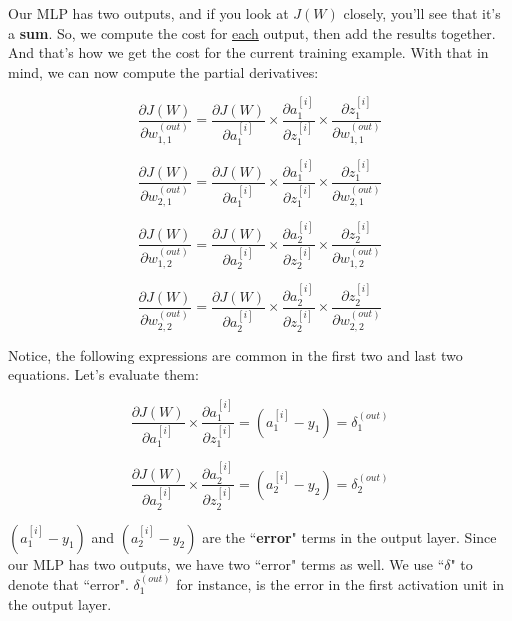 \documentclass[12pt, letterpaper]{article}
\begin{document}
Our MLP has two outputs, and if you look at $J(W)$ 
closely, you'll see that it's a \textbf{sum}. So, we compute 
the cost for \underline{each} output, then add the results together. 
And that's how we get the cost for the current training
example. With that in mind, we can now compute the partial
derivatives:

\vspace{5mm} %

\[
    \frac{\partial J(W)}{\partial w_{1,1}^{(out)}} = 
    \frac{\partial J(W)}{\partial a_{1}^{[i]}} \times
    \frac{\partial a_{1}^{[i]}}{\partial z_{1}^{[i]}} \times
    \frac{\partial z_{1}^{[i]}}{\partial w_{1,1}^{(out)}}
\]

\[
    \frac{\partial J(W)}{\partial w_{2,1}^{(out)}} = 
    \frac{\partial J(W)}{\partial a_{1}^{[i]}} \times
    \frac{\partial a_{1}^{[i]}}{\partial z_{1}^{[i]}} \times
    \frac{\partial z_{1}^{[i]}}{\partial w_{2,1}^{(out)}}
\]

\[
    \frac{\partial J(W)}{\partial w_{1,2}^{(out)}} = 
    \frac{\partial J(W)}{\partial a_{2}^{[i]}} \times
    \frac{\partial a_{2}^{[i]}}{\partial z_{2}^{[i]}} \times
    \frac{\partial z_{2}^{[i]}}{\partial w_{1,2}^{(out)}}
\]

\[
    \frac{\partial J(W)}{\partial w_{2,2}^{(out)}} = 
    \frac{\partial J(W)}{\partial a_{2}^{[i]}} \times
    \frac{\partial a_{2}^{[i]}}{\partial z_{2}^{[i]}} \times
    \frac{\partial z_{2}^{[i]}}{\partial w_{2,2}^{(out)}}
\]

\vspace{5mm} %

Notice, the following expressions are common in the first two and
last two equations. Let's evaluate them:

\[
    \frac{\partial J(W)}{\partial a_{1}^{[i]}} \times
    \frac{\partial a_{1}^{[i]}}{\partial z_{1}^{[i]}} = 
    (a_{1}^{[i]} - y_1) = \delta_1^{(out)}
\]

\[
    \frac{\partial J(W)}{\partial a_{2}^{[i]}} \times
    \frac{\partial a_{2}^{[i]}}{\partial z_{2}^{[i]}} = 
    (a_{2}^{[i]} - y_2) = \delta_2^{(out)}
\]

\vspace{5mm} %

$(a_{1}^{[i]} - y_1)$ and $(a_{2}^{[i]} - y_2)$ are the 
``\textbf{error}" terms in the output layer. Since our MLP
has two outputs, we have two ``error" terms as well. We use 
``$\delta$" to denote that ``error". $\delta_1^{(out)}$ for 
instance, is the error in the first activation unit in the 
output layer.
\end{document}
